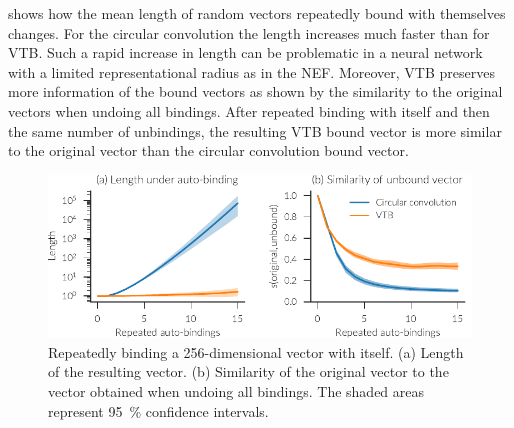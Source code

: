  shows how the mean length of random vectors repeatedly bound with themselves changes.
For the circular convolution the length increases much faster than for VTB\@.
Such a rapid increase in length can be problematic in a neural network with a limited representational radius as in the NEF\@.
Moreover, VTB preserves more information of the bound vectors as shown by the similarity to the original vectors when undoing all bindings.
After repeated binding with itself and then the same number of unbindings, the resulting VTB bound vector is more similar to the original vector than the circular convolution bound vector.
\begin{figure}
    \centering
    \includegraphics{figures/bindings-autoconv}
    \caption[Repeatedly binding a 256-dimensional vector with itself]{Repeatedly binding a 256-dimensional vector with itself. (a) Length of the resulting vector. (b) Similarity of the original vector to the vector obtained when undoing all bindings. The shaded areas represent \SI{95}{\percent} confidence intervals.}\label{fig:bindings-autoconv}
\end{figure}


